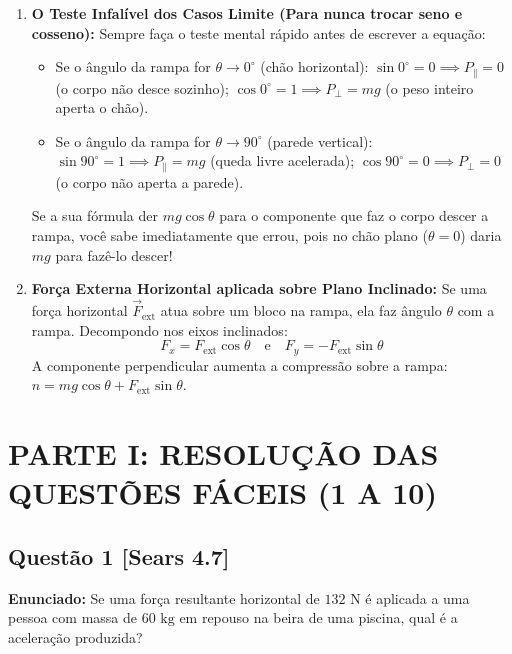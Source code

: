 \documentclass[11pt,a4paper]{article}
\begin{document}
\begin{enumerate}[label=\textbf{\Roman*.}]
    \item \textbf{O Teste Infalível dos Casos Limite (Para nunca trocar seno e cosseno):}
    Sempre faça o teste mental rápido antes de escrever a equação:
    \begin{itemize}
        \item Se o ângulo da rampa for $\theta \to 0^\circ$ (chão horizontal):
        $\sin 0^\circ = 0 \implies P_\parallel = 0$ (o corpo não desce sozinho);
        $\cos 0^\circ = 1 \implies P_\perp = mg$ (o peso inteiro aperta o chão).
        \item Se o ângulo da rampa for $\theta \to 90^\circ$ (parede vertical):
        $\sin 90^\circ = 1 \implies P_\parallel = mg$ (queda livre acelerada);
        $\cos 90^\circ = 0 \implies P_\perp = 0$ (o corpo não aperta a parede).
    \end{itemize}
    Se a sua fórmula der $mg\cos\theta$ para o componente que faz o corpo descer a rampa, você sabe imediatamente que errou, pois no chão plano ($\theta=0$) daria $mg$ para fazê-lo descer!

    \item \textbf{Força Externa Horizontal aplicada sobre Plano Inclinado:}
    Se uma força horizontal $\vec{F}_{\text{ext}}$ atua sobre um bloco na rampa, ela faz ângulo $\theta$ com a rampa. Decompondo nos eixos inclinados:
    \[ F_x = F_{\text{ext}} \cos\theta \quad \text{e} \quad F_y = -F_{\text{ext}} \sin\theta \]
    A componente perpendicular aumenta a compressão sobre a rampa: $n = mg\cos\theta + F_{\text{ext}}\sin\theta$.
\end{enumerate}

\vspace{0.4cm}

\section*{PARTE I: RESOLUÇÃO DAS QUESTÕES FÁCEIS (1 A 10)}

\subsection*{Questão 1 [Sears 4.7]}
\textbf{Enunciado:} Se uma força resultante horizontal de $132\text{ N}$ é aplicada a uma pessoa com massa de $60\text{ kg}$ em repouso na beira de uma piscina, qual é a aceleração produzida?
\end{document}

